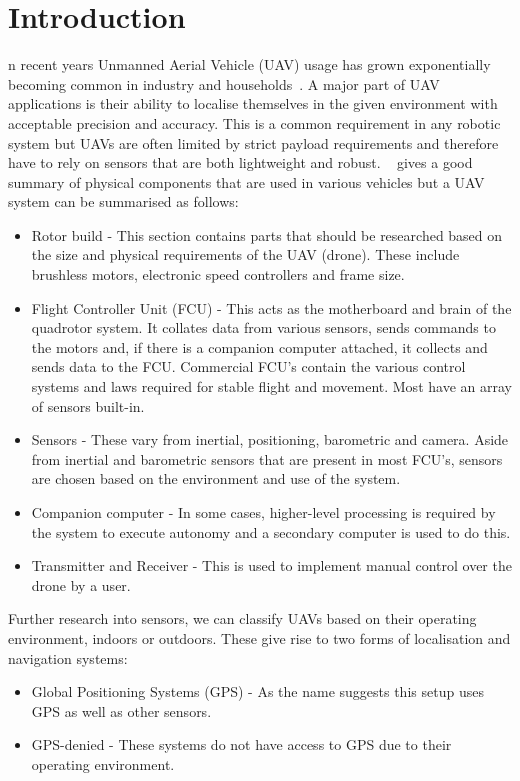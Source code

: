 \let\textcircled=\pgftextcircled
\chapter{Introduction}\label{ch:intro}%
    n recent years Unmanned Aerial Vehicle (UAV) usage has grown exponentially becoming common in industry and households~\cite{custers2016drones}.
    A major part of UAV applications is their ability to localise themselves in the given environment with acceptable precision and accuracy.
    This is a common requirement in any robotic system but UAVs are often limited by strict payload requirements and therefore have to rely on sensors that are both lightweight and robust.
    ~\citep{ardupilotadvanced} gives a good summary of physical components that are used in various vehicles but a UAV system can be summarised as follows:
    \begin{itemize}
        \item Rotor build - This section contains parts that should be researched based on the size and physical requirements of the UAV (drone).
        These include brushless motors, electronic speed controllers and frame size.
        \item Flight Controller Unit (FCU) - This acts as the motherboard and brain of the quadrotor system.
        It collates data from various sensors, sends commands to the motors and, if there is a companion computer attached, it collects and sends data to the FCU.
        Commercial FCU's contain the various control systems and laws required for stable flight and movement.
        Most have an array of sensors built-in.
        \item Sensors - These vary from inertial, positioning, barometric and camera.
        Aside from inertial and barometric sensors that are present in most FCU's, sensors are chosen based on the environment and use of the system.
        \item Companion computer - In some cases, higher-level processing is required by the system to execute autonomy and a secondary computer is used to do this.
        \item Transmitter and Receiver - This is used to implement manual control over the drone by a user.
    \end{itemize}

Further research into sensors, we can classify UAVs based on their operating environment, indoors or outdoors.
These give rise to two forms of localisation and navigation systems:
    \begin{itemize}
        \item Global Positioning Systems (GPS) - As the name suggests this setup uses GPS as well as other sensors.
        \item GPS-denied - These systems do not have access to GPS due to their operating environment.
    \end{itemize}

